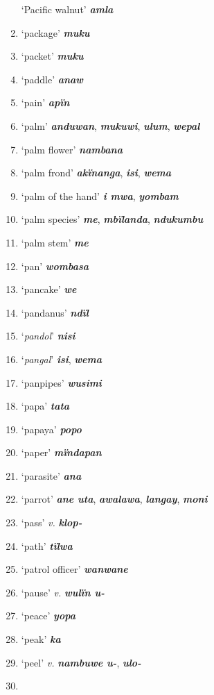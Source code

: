 \begin{enumerate}[noitemsep, label={}, align=left, widest=190, labelsep=1ex,leftmargin=*,itemindent=-10pt]
‘Pacific walnut’ \textbf{\textit{amla}} \item
‘package’ \textbf{\textit{muku}} \item
‘packet’ \textbf{\textit{muku}} \item
‘paddle’ \textbf{\textit{anaw}} \item
‘pain’ \textbf{\textit{apïn}} \item
‘palm’ \textbf{\textit{anduwan}}, \textbf{\textit{mukuwi}}, \textbf{\textit{ulum}}, \textbf{\textit{wepal}} \item
‘palm flower’ \textbf{\textit{nambana}} \item
‘palm frond’ \textbf{\textit{akïnanga}}, \textbf{\textit{isi}}, \textbf{\textit{wema}} \item
‘palm of the hand’ \textbf{\textit{i mwa}}, \textbf{\textit{yombam}} \item
‘palm species’ \textbf{\textit{me}}, \textbf{\textit{mbïlanda}}, \textbf{\textit{ndukumbu}} \item
‘palm stem’ \textbf{\textit{me}} \item
‘pan’ \textbf{\textit{wombasa}} \item
‘pancake’ \textbf{\textit{we}} \item
‘pandanus’ \textbf{\textit{ndïl}} \item
‘\textit{pandol}’ \textbf{\textit{nisi}} \item
‘\textit{pangal}’ \textbf{\textit{isi}}, \textbf{\textit{wema}} \item
‘panpipes’ \textbf{\textit{wusimi}} \item
‘papa’ \textbf{\textit{tata}} \item
‘papaya’ \textbf{\textit{popo}} \item
‘paper’ \textbf{\textit{mïndapan}} \item
‘parasite’ \textbf{\textit{ana}} \item
‘parrot’ \textbf{\textit{ane uta}}, \textbf{\textit{awalawa}}, \textbf{\textit{langay}}, \textbf{\textit{moni}} \item
‘pass’ \textit{v.} \textbf{\textit{klop-}} \item
‘path’ \textbf{\textit{tïlwa}} \item
‘patrol officer’ \textbf{\textit{wanwane}} \item
‘pause’ \textit{v.} \textbf{\textit{wulïn u-}} \item
‘peace’ \textbf{\textit{yopa}} \item
‘peak’ \textbf{\textit{ka}} \item
‘peel’ \textit{v.} \textbf{\textit{nambuwe u-}}, \textbf{\textit{ulo-}} \item

\end{enumerate}
